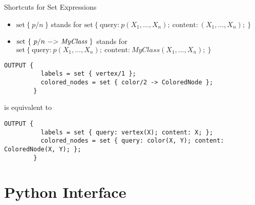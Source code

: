 \documentclass[%
beamer,%
english,%
10pt,%
]{beamer}
\newcommand{\blue}[1]{{\color{blue}#1}}
\begin{document}
\begin{frame}[fragile]{Shortcuts for Set Expressions}

    \begin{itemize}
        \item
            \blue{$\text{set}~\{~p/n~\}$}
            stands for
            \blue{$\text{set}~\{~\text{query:}~p(X_1,\dots,X_n);~\text{content:}~(X_1,\dots,X_n);~\}$}
        \item
            \blue{$\text{set}~\{~p/n~\lstinline{->}~\textit{MyClass}~\}$}
            stands for \\
            \blue{$\text{set}~\{~\text{query:}~p(X_1,\dots,X_n);~\text{content:}~\textit{MyClass}(X_1,\dots,X_n);~\}$}
    \end{itemize}

    \begin{example}
        \begin{lstlisting}[basicstyle=\footnotesize,autogobble]
        OUTPUT {
          labels = set { vertex/1 };
          colored_nodes = set { color/2 -> ColoredNode };
        }
        \end{lstlisting}
        is equivalent to
        \begin{lstlisting}[basicstyle=\footnotesize,autogobble]
        OUTPUT {
          labels = set { query: vertex(X); content: X; };
          colored_nodes = set { query: color(X, Y); content: ColoredNode(X, Y); };
        }
        \end{lstlisting}
    \end{example}
\end{frame}



\section{Python Interface}
\end{document}
